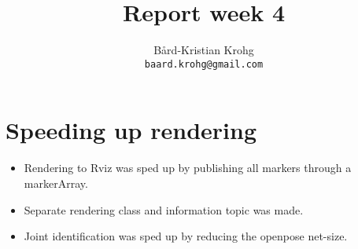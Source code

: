 \documentclass[a4paper]{article}
\title{Report week 4}
\author{Bård-Kristian Krohg \\ \texttt{baard.krohg@gmail.com}}
\begin{document}
\maketitle

\section{Speeding up rendering}
\begin{itemize}
\item Rendering to Rviz was sped up by publishing all markers through a markerArray.
\item Separate rendering class and information topic was made.
\item Joint identification was sped up by reducing the openpose net-size.
\end{itemize}
\end{document}

